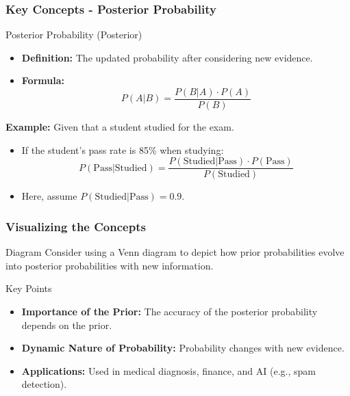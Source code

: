 \documentclass[aspectratio=169]{beamer}
\begin{document}
\begin{frame}[fragile]
    \frametitle{Key Concepts - Posterior Probability}
    \begin{block}{Posterior Probability (Posterior)}
        \begin{itemize}
            \item \textbf{Definition:} The updated probability after considering new evidence.
            \item \textbf{Formula:} 
            \[
            P(A|B) = \frac{P(B|A) \cdot P(A)}{P(B)}
            \]
        \end{itemize}
    \end{block}
    \begin{example}
        \textbf{Example:} Given that a student studied for the exam.
        \begin{itemize}
            \item If the student's pass rate is 85\% when studying:
            \[
            P(\text{Pass} | \text{Studied}) = \frac{P(\text{Studied} | \text{Pass}) \cdot P(\text{Pass})}{P(\text{Studied})}
            \]
            \item Here, assume \(P(\text{Studied} | \text{Pass}) = 0.9\).
        \end{itemize}
    \end{example}
\end{frame}

\begin{frame}[fragile]
    \frametitle{Visualizing the Concepts}
    \begin{block}{Diagram}
        Consider using a Venn diagram to depict how prior probabilities evolve into posterior probabilities with new information.
    \end{block}

    \begin{block}{Key Points}
        \begin{itemize}
            \item \textbf{Importance of the Prior:} The accuracy of the posterior probability depends on the prior.
            \item \textbf{Dynamic Nature of Probability:} Probability changes with new evidence.
            \item \textbf{Applications:} Used in medical diagnosis, finance, and AI (e.g., spam detection).
        \end{itemize}
    \end{block}
\end{frame}
\end{document}
